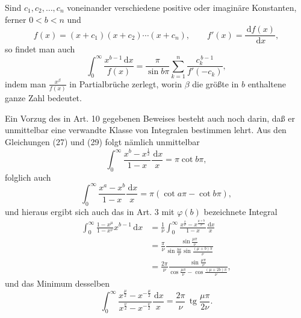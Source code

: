 \documentclass[11pt]{article}
\newcommand{\dd}{\,\mathrm d}
\newcommand{\tg}{\operatorname{tg}}
\begin{document}
Sind $c_1,c_2,\ldots,c_n$ voneinander verschiedene positive oder imaginäre Konstanten, ferner $0<b<n$ und
\[
f(x)=(x+c_1)(x+c_2)\cdots(x+c_n),\qquad
f'(x)=\frac{\dd f(x)}{\dd x},
\]
so findet man auch
\begin{equation}
\int_0^\infty\frac{x^{b-1}\dd x}{f(x)}
=\frac{\pi}{\sin b\pi}
 \sum_{k=1}^{n}\frac{c_k^{\,b-1}}{f'(-c_k)},
\tag{34}
\end{equation}
indem man $\frac{x^\beta}{f(x)}$ in Partialbrüche zerlegt, worin $\beta$ die größte in $b$ enthaltene ganze Zahl bedeutet.

Ein Vorzug des in Art. 10 gegebenen Beweises besteht auch noch darin, daß er unmittelbar eine verwandte Klasse von Integralen bestimmen lehrt. Aus den Gleichungen (27) und (29) folgt nämlich unmittelbar
\[
\int_0^\infty\frac{x^b-x^{\frac12}}{1-x}\frac{\dd x}{x}
=\pi\cot b\pi,
\]
folglich auch
\begin{equation}
\int_0^\infty\frac{x^a-x^b}{1-x}\frac{\dd x}{x}
=\pi(\cot a\pi-\cot b\pi),
\tag{35}
\end{equation}
und hieraus ergibt sich auch das in Art. 3 mit $\varphi(b)$ bezeichnete Integral
\[
\begin{aligned}
\int_0^\infty\frac{1-x^\mu}{1-x^\nu}x^{b-1}\dd x
&=\frac1\nu\int_0^\infty
  \frac{x^{\frac b\nu}-x^{\frac{\mu+b}{\nu}}}{1-x}\frac{\dd x}{x}\\
&=\frac{\pi}{\nu}
  \frac{\sin\frac{\mu\pi}{\nu}}
       {\sin\frac{b\pi}{\nu}\sin\frac{(\mu+b)\pi}{\nu}}\\
&=\frac{2\pi}{\nu}
  \frac{\sin\frac{\mu\pi}{\nu}}
       {\cos\frac{\mu\pi}{\nu}-\cos\frac{(\mu+2b)\pi}{\nu}},
\end{aligned}
\]
und das Minimum desselben
\[
\int_0^\infty
\frac{x^{\frac{\mu}{2}}-x^{-\frac{\mu}{2}}}
     {x^{\frac{\nu}{2}}-x^{-\frac{\nu}{2}}}
\frac{\dd x}{x}
=\frac{2\pi}{\nu}\,\tg\frac{\mu\pi}{2\nu}.
\]
\end{document}
